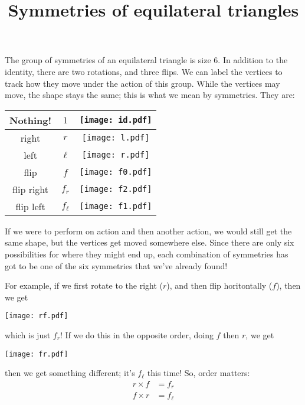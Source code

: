 \documentclass[12pt]{report}
\title{Symmetries of equilateral triangles}
\begin{document}
\thispagestyle{empty}

The group of symmetries of an equilateral triangle is size 6.  In
addition to the identity, there are two rotations, and three flips.
We can label the vertices to track how they move under the action of
this group.  While the vertices may move, the shape stays the same; this
is what we mean by symmetries.  They are:
\begin{figure*}
   \centering
   \begin{tabular}{|c|c|c|}
     \hline
     Nothing! & $1$ & \texttt{[image: id.pdf]}\\
     \hline
     right & $r$ & \texttt{[image: l.pdf]}\\
     \hline
     left & $\ell$ &\texttt{[image: r.pdf]}\\
     \hline
     flip & $f$ & \texttt{[image: f0.pdf]}\\
     \hline
     flip right & $f_r$ &\texttt{[image: f2.pdf]}\\
     \hline
     flip left & $f_\ell$ & \texttt{[image: f1.pdf]}\\
     \hline
   \end{tabular}
\end{figure*}

If we were to perform on action and then another action, we would
still get the same shape, but the vertices get moved somewhere else.
Since there are only six possibilities for where they might end up,
each combination of symmetries has got to be one of the six symmetries
that we've already found!

For example, if we first rotate to the right ($r$), and then flip
horitontally ($f$), then we get
\begin{figure*}[h]
  \centering
   \texttt{[image: rf.pdf]}
\end{figure*}
which is just $f_r$!  If we do this in the opposite order, doing $f$
then $r$, we get
\begin{figure*}[h]
  \centering
   \texttt{[image: fr.pdf]}
\end{figure*}
then we get something different; it's $f_\ell$ this time!  So, order matters:
\begin{eqnarray*}
  r \times{} f &= f_r\\
  f \times{} r &= f_\ell\\
\end{eqnarray*}
\end{document}
